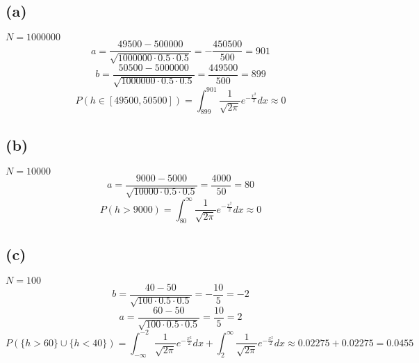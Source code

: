 \documentclass[11pt]{article}
\begin{document}
\subsection*{(a)}
$N=1000000$
\[a=\frac{49500-500000}{\sqrt{1000000\cdot0.5\cdot0.5}}=-\frac{450500}{500}=901\]
\[b=\frac{50500-5000000}{\sqrt{1000000\cdot0.5\cdot0.5}}=\frac{449500}{500}=899\]
\[P(h\in[49500,50500])=\int_{899}^{901}\frac{1}{\sqrt{2\pi}}e^{-\frac{x^2}{2}}dx\approx0\]
\subsection*{(b)}
$N=10000$
\[a=\frac{9000-5000}{\sqrt{10000\cdot0.5\cdot0.5}}=\frac{4000}{50}=80\]
\[P(h>9000)=\int_{80}^{\infty}\frac{1}{\sqrt{2\pi}}e^{-\frac{x^2}{2}}dx\approx0\]
\subsection*{(c)}
$N=100$
\[b=\frac{40-50}{\sqrt{100\cdot0.5\cdot0.5}}=-\frac{10}{5}=-2\]
\[a=\frac{60-50}{\sqrt{100\cdot0.5\cdot0.5}}=\frac{10}{5}=2\]
\[P(\{h>60\}\cup\{h<40\})=\int_{-\infty}^{-2}\frac{1}{\sqrt{2\pi}}e^{-\frac{x^2}{2}}dx+\int_{2}^{\infty}\frac{1}{\sqrt{2\pi}}e^{-\frac{x^2}{2}}dx\approx0.02275+0.02275=0.0455\]
\end{document}

